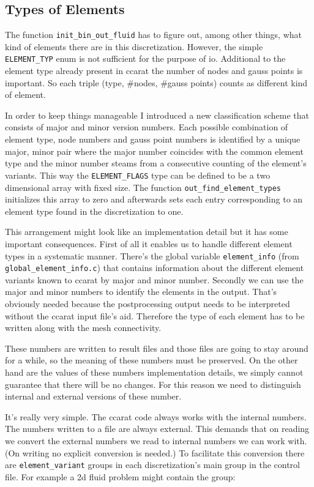 \subsection{Types of Elements}

The function \texttt{init{\_}bin{\_}out{\_}fluid} has to figure
out, among other things, what kind of elements there are in this discretization.
However, the simple \texttt{ELEMENT{\_}TYP} enum is not sufficient
for the purpose of io. Additional to the element type already present
in ccarat the number of nodes and gauss points is important. So each
triple (type, {\#}nodes, {\#}gauss points) counts as different
kind of element.

In order to keep things manageable I introduced a new classification
scheme that consists of major and minor version numbers. Each possible
combination of element type, node numbers and gauss point numbers
is identified by a unique major, minor pair where the major number
coincides with the common element type and the minor number steams
from a consecutive counting of the element's variants. This way the
\texttt{ELEMENT{\_}FLAGS} type can be defined to be a two dimensional
array with fixed size. The function \texttt{out{\_}find{\_}element{\_}types}
initializes this array to zero and afterwards sets each entry corresponding
to an element type found in the discretization to one.

This arrangement might look like an implementation detail but it has
some important consequences. First of all it enables us to handle
different element types in a systematic manner. There's the global
variable \texttt{element{\_}info} (from \texttt{global{\_}element{\_}info.c})
that contains information about the different element variants known
to ccarat by major and minor number. Secondly we can use the major
and minor numbers to identify the elements in the output. That's obviously
needed because the postprocessing output needs to be interpreted without
the ccarat input file's aid. Therefore the type of each element has
to be written along with the mesh connectivity.

These numbers are written to result files and those files are going
to stay around for a while, so the meaning of these numbers must be
preserved. On the other hand are the values of these numbers implementation
details, we simply cannot guarantee that there will be no changes.
For this reason we need to distinguish internal and external versions
of these number.

It's really very simple. The ccarat code always works with the internal
numbers. The numbers written to a file are always external. This demands
that on reading we convert the external numbers we read to internal
numbers we can work with. (On writing no explicit conversion is needed.)
To facilitate this conversion there are \texttt{element{\_}variant}
groups in each discretization's main group in the control file. For
example a 2d fluid problem might contain the group: 

